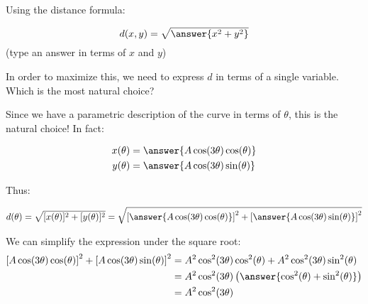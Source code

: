 \documentclass{ximera}
\begin{document}
\begin{exercise}
\begin{exercise}
\begin{image}  
\end{image} 
\end{exercise}

Using the distance formula:

\[
d(x,y) = \sqrt{\answer{x^2+y^2}}
\]
(type an answer in terms of $x$ and $y$)

In order to maximize this, we need to express $d$ in terms of a single variable.  Which is the most natural choice?

\begin{multipleChoice}
\choice[correct]{$\theta$}
\end{multipleChoice}
Since we have a parametric description of the curve in terms of $\theta$, this is the natural choice! In fact:

\begin{align*}
x(\theta) &= \answer{A\cos(3\theta)\cos(\theta)} \\
y(\theta) &= \answer{A\cos(3\theta)\sin(\theta)}
\end{align*}

Thus:

\[
d(\theta) = \sqrt{[x(\theta)]^2+[y(\theta)]^2} = \sqrt{\left[\answer{A\cos(3\theta)\cos(\theta)}\right]^2+\left[ \answer{A\cos(3\theta)\sin(\theta)} \right]^2}
\]

\begin{exercise}
We can simplify the expression under the square root:
\begin{align*}
\left[A\cos(3\theta)\cos(\theta)\right]^2+\left[A\cos(3\theta)\sin(\theta) \right]^2 &= A^2\cos^2(3\theta) \cos^2(\theta) + A^2\cos^2(3\theta) \sin^2(\theta)\\
&=  A^2\cos^2(3\theta) \left( \answer{\cos^2(\theta)+\sin^2(\theta)} \right) \\
&= A^2\cos^2(3\theta)
\end{align*}


\end{exercise}
\end{exercise}
\end{document}
